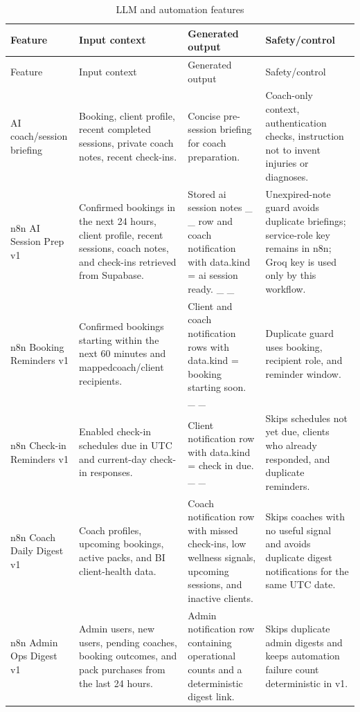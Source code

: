 \documentclass[12pt,a4paper,openany]{report}
\begin{document}
\begingroup
\scriptsize
\setlength{\tabcolsep}{3pt}
\renewcommand{\arraystretch}{1.20}
\setlength{\LTpre}{5pt}
\setlength{\LTpost}{10pt}
\begin{longtable}{|L{2.74cm}|L{5.18cm}|L{4.18cm}|L{2.30cm}|}
\caption{LLM and automation features}\label{tab:pdf-84-40} \\
\hline
{}
Feature & Input context & Generated output & Safety/control \\ \hline
\endfirsthead
\hline
{}
Feature & Input context & Generated output & Safety/control \\ \hline
\endhead
AI coach/session briefing & Booking, client profile, recent completed sessions, private coach notes, recent check-ins. & Concise pre-session briefing for coach preparation. & Coach-only context, authentication checks, instruction not to invent injuries or diagnoses. \\ \hline
n8n AI Session Prep v1 & Confirmed bookings in the next 24 hours, client profile, recent sessions, coach notes, and check-ins retrieved from Supabase. & Stored ai session notes \_ \_ row and coach notification with data.kind = ai session ready. \_ \_ & Unexpired-note guard avoids duplicate briefings; service-role key remains in n8n; Groq key is used only by this workflow. \\ \hline
n8n Booking Reminders v1 & Confirmed bookings starting within the next 60 minutes and mappedcoach/client recipients. & Client and coach notification rows with data.kind = booking starting soon. \_ \_ & Duplicate guard uses booking, recipient role, and reminder window. \\ \hline
n8n Check-in Reminders v1 & Enabled check-in schedules due in UTC and current-day check-in responses. & Client notification row with data.kind = check in due. \_ \_ & Skips schedules not yet due, clients who already responded, and duplicate reminders. \\ \hline
n8n Coach Daily Digest v1 & Coach profiles,  upcoming bookings, active packs, and BI client-health data. & Coach notification row with missed check-ins, low wellness signals, upcoming sessions, and inactive clients. & Skips coaches with no useful signal and avoids duplicate digest notifications for the same UTC date. \\ \hline
n8n Admin Ops Digest v1 & Admin users, new users, pending coaches, booking outcomes, and pack purchases from the last 24 hours. & Admin notification row containing operational counts and a deterministic digest link. & Skips duplicate admin digests and keeps automation failure count deterministic in v1. \\ \hline
\end{longtable}
\endgroup
\end{document}
